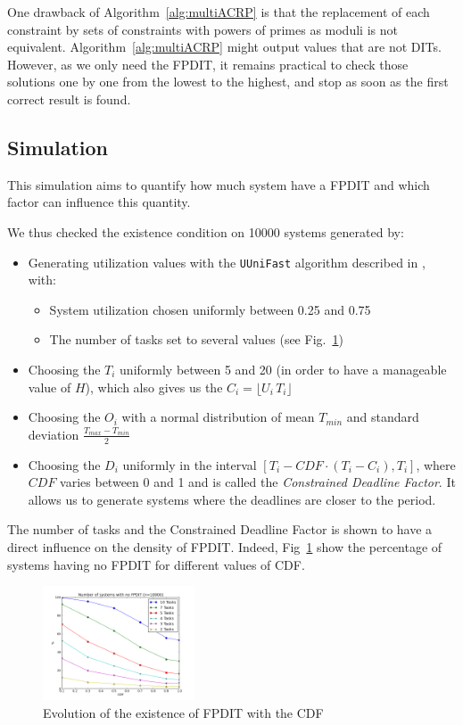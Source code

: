 \documentclass[conference]{IEEEtran}
\begin{document}
        One drawback of Algorithm~\ref{alg:multiACRP} is that the replacement of each
		constraint by sets of constraints with powers of primes as moduli is not
		equivalent. Algorithm~\ref{alg:multiACRP} might output values that are not
		DITs. However, as we only need the FPDIT, it remains practical to check those
		solutions one by one from the lowest to the highest, and stop as soon as the
		first correct result is found.

	\subsection{Simulation}
	\label{sct:noFPDITsimu}

	This simulation aims to quantify how much system have a FPDIT and which factor can influence this quantity.

	We thus checked the existence condition on 10000 systems generated by:
	\begin{itemize}
		\item Generating utilization values with the \texttt{UUniFast} algorithm described in \cite{bini2005measuring}, with:
		\begin{itemize}
			\item System utilization chosen uniformly between 0.25 and 0.75
			\item The number of tasks set to several values (see Fig.~\ref{fig:noFPDIT})
		\end{itemize}
		\item Choosing the $T_i$ uniformly between 5 and 20 (in order to have a manageable value of $H$), which also gives us the $C_i = \lfloor U_i \, T_i \rfloor$
		\item Choosing the $O_i$ with a normal distribution of mean $T_{min}$ and standard deviation $\frac{T_{max} - T_{min}}{2}$
		\item Choosing the $D_i$ uniformly in the interval \mbox{$[T_i - CDF \cdot (T_i - C_i), T_i]$}, where $CDF$ varies between 0 and 1 and is called the \emph{Constrained Deadline Factor}. It allows us to generate systems where the deadlines are closer to the period.
	\end{itemize}

	The number of tasks and the Constrained Deadline Factor is shown to have a direct influence on the density of FPDIT. Indeed, Fig~\ref{fig:noFPDIT} show the percentage of systems having no FPDIT for different values of CDF.

	\begin{figure}[h]
	\begin{center}
		\includegraphics[width=0.4\textwidth]{figs/nofpdit_4.png}
	\end{center}
	\caption{Evolution of the existence of FPDIT with the CDF}
	\label{fig:noFPDIT}
	\end{figure}
\end{document}
